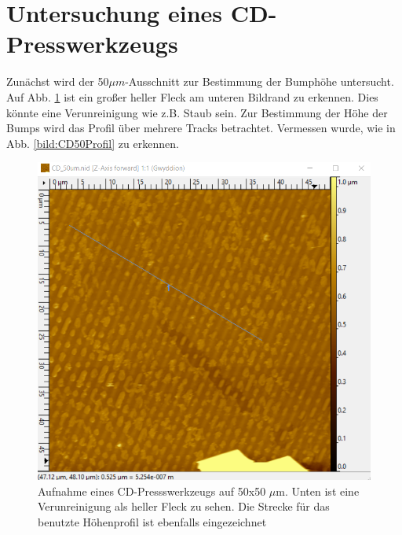 

\section{Untersuchung eines CD-Presswerkzeugs}

Zunächst wird der 50$\mu m$-Ausschnitt zur Bestimmung der Bumphöhe untersucht.
Auf Abb. \ref{bild:CD50Linie} ist ein großer heller Fleck am unteren Bildrand zu erkennen. Dies könnte eine Verunreinigung wie z.B. Staub sein. 
Zur Bestimmung der Höhe der Bumps wird das Profil über mehrere Tracks betrachtet. Vermessen wurde, wie in Abb. \ref{bild:CD50Profil} 
zu erkennen. 

\begin{figure}[h]
    \centering
    \includegraphics[scale = 0.5]{Bilder/CD50Linie.png}
    \caption{Aufnahme eines CD-Pressswerkzeugs auf 50x50 $\mu$m. Unten ist eine Verunreinigung als heller Fleck zu sehen. Die Strecke 
    für das benutzte Höhenprofil ist ebenfalls eingezeichnet}
    \label{bild:CD50Linie}
\end{figure}

